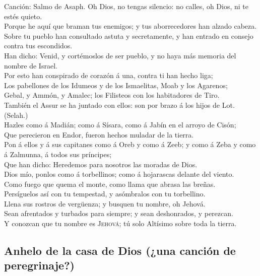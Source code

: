  Canción: Salmo de Asaph. Oh Dios, no tengas silencio: no
calles, oh Dios, ni te estés quieto.\\
 Porque he aquí que braman tus enemigos; y tus
aborrecedores han alzado cabeza.\\
 Sobre tu pueblo han consultado astuta y secretamente, y
han entrado en consejo contra tus escondidos.\\
 Han dicho: Venid, y cortémoslos de ser pueblo, y no haya
más memoria del nombre de Israel.\\
 Por esto han conspirado de corazón á una, contra ti han
hecho liga;\\
 Los pabellones de los Idumeos y de los Ismaelitas, Moab y
los Agarenos;\\
 Gebal, y Ammón, y Amalec; los Filisteos con los
habitadores de Tiro.\\
 También el Assur se ha juntado con ellos: son por brazo á
los hijos de Lot. (Selah.)\\
 Hazles como á Madián; como á Sísara, como á Jabín en el
arroyo de Cisón;\\
 Que perecieron en Endor, fueron hechos muladar de la
tierra.\\
 Pon á ellos y á sus capitanes como á Oreb y como á Zeeb;
y como á Zeba y como á Zalmunna, á todos sus príncipes;\\
 Que han dicho: Heredemos para nosotros las moradas de
Dios.\\
 Dios mío, ponlos como á torbellinos; como á hojarascas
delante del viento.\\
 Como fuego que quema el monte, como llama que abrasa las
breñas.\\
 Persíguelos así con tu tempestad, y asómbralos con tu
torbellino.\\
 Llena sus rostros de vergüenza; y busquen tu nombre, oh
Jehová.\\
 Sean afrentados y turbados para siempre; y sean
deshonrados, y perezcan.\\
 Y conozcan que tu nombre es \textsc{Jehová}; tú solo
Altísimo sobre toda la tierra.

\hypertarget{anhelo-de-la-casa-de-dios-una-canciuxf3n-de-peregrinaje}{%
\subsection{Anhelo de la casa de Dios (¿una canción de
peregrinaje?)}\label{anhelo-de-la-casa-de-dios-una-canciuxf3n-de-peregrinaje}}

